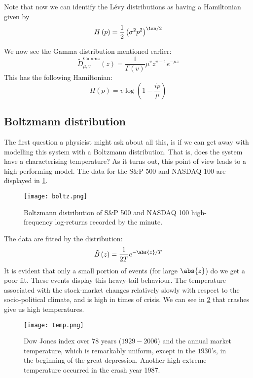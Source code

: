 \documentclass{booc}
\begin{document}
Note that now we can identify the L\'evy distributions as having a Hamiltonian
given by 
\begin{equation}
H\left( p \right) = 
\frac{1}{2} \left( \sigma^2 p^2  \right)^{\lam / 2}
\end{equation}

\begin{exm}
We now see the Gamma distribution mentioned earlier:
\begin{equation}
\tilde D^{\text{Gamma}}_{\mu,v}\left( z \right) = 
\frac{1}{\Gamma\left( v \right)} \mu^v z^{v-1} e^{-\mu z}
\end{equation}
This has the following Hamiltonian:
\begin{equation}
H\left( p \right) = v\log\left( 1 - \frac{ip}{\mu} \right)
\end{equation}
\end{exm}

\subsection{Boltzmann distribution}

The first question a physicist might ask about all this, is if we can get
away with modelling this system with a Boltzmann distribution.
That is, does the system have a characterising temperature?
As it turns out, this point of view leads to a high-performing model.
The data for the S\&P 500 and NASDAQ 100 are displayed in \cref{exr:boltz}.

\begin{figure}
\centering
\texttt{[image: boltz.png]}
\caption{Boltzmann distribution of S\&P 500 and 
NASDAQ 100 high-frequency log-returns recorded by the minute.}
\label{exr:boltz}
\end{figure}

The data are fitted by the distribution:
\begin{equation}
\tilde B\left( z \right) = 
\frac{1}{2T} e^{-\abs{z} / T}
\end{equation}
It is evident that only a small portion of events
(for large $\abs{z}$) do we get a poor fit. 
These events display this heavy-tail behaviour. 
The temperature associated with the stock-market changes relatively
slowly with respect to the socio-political climate, and is high in times of crisis.
We can see in \cref{fig:temp} that crashes give us high temperatures.
\begin{figure}
\centering
\texttt{[image: temp.png]}
\caption{Dow Jones index over $78$ years ($1929-2006$) and the annual market temperature,
which is remarkably uniform, except in the $1930$'s, in the beginning of the great
depression. Another high extreme temperature occurred in the crash year 1987.}
\label{fig:temp}
\end{figure}
\end{document}
